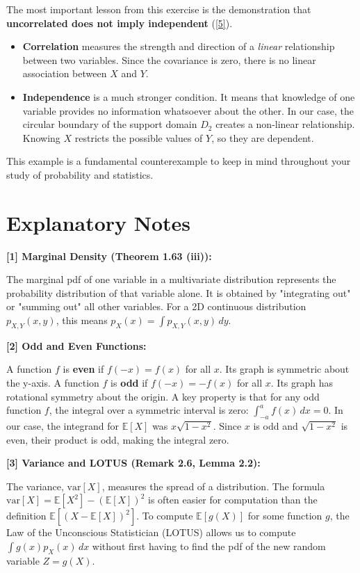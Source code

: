 \documentclass[11pt,a4paper]{article}
\theoremstyle{mystyle}
\begin{document}
The most important lesson from this exercise is the demonstration that \textbf{uncorrelated does not imply independent} (\hyperlink{note5}{[5]}).
\begin{itemize}
    \item \textbf{Correlation} measures the strength and direction of a \textit{linear} relationship between two variables. Since the covariance is zero, there is no linear association between $X$ and $Y$.
    \item \textbf{Independence} is a much stronger condition. It means that knowledge of one variable provides no information whatsoever about the other. In our case, the circular boundary of the support domain $D_2$ creates a non-linear relationship. Knowing $X$ restricts the possible values of $Y$, so they are dependent.
\end{itemize}
This example is a fundamental counterexample to keep in mind throughout your study of probability and statistics.

\newpage
\section*{Explanatory Notes}

\hypertarget{note1}{\textbf{[1] Marginal Density (Theorem 1.63 (iii)):}}
The marginal pdf of one variable in a multivariate distribution represents the probability distribution of that variable alone. It is obtained by "integrating out" or "summing out" all other variables. For a 2D continuous distribution $p_{X,Y}(x,y)$, this means $p_X(x) = \int p_{X,Y}(x,y) \,dy$.

\hypertarget{note2}{\textbf{[2] Odd and Even Functions:}}
A function $f$ is \textbf{even} if $f(-x) = f(x)$ for all $x$. Its graph is symmetric about the y-axis.
A function $f$ is \textbf{odd} if $f(-x) = -f(x)$ for all $x$. Its graph has rotational symmetry about the origin.
A key property is that for any odd function $f$, the integral over a symmetric interval is zero: $\int_{-a}^{a} f(x) \,dx = 0$. In our case, the integrand for $\mathbb{E}[X]$ was $x \sqrt{1-x^2}$. Since $x$ is odd and $\sqrt{1-x^2}$ is even, their product is odd, making the integral zero.

\hypertarget{note3}{\textbf{[3] Variance and LOTUS (Remark 2.6, Lemma 2.2):}}
The variance, $\text{var}[X]$, measures the spread of a distribution. The formula $\text{var}[X] = \mathbb{E}[X^2] - (\mathbb{E}[X])^2$ is often easier for computation than the definition $\mathbb{E}[(X-\mathbb{E}[X])^2]$. To compute $\mathbb{E}[g(X)]$ for some function $g$, the Law of the Unconscious Statistician (LOTUS) allows us to compute $\int g(x) p_X(x) \,dx$ without first having to find the pdf of the new random variable $Z=g(X)$.
\end{document}

